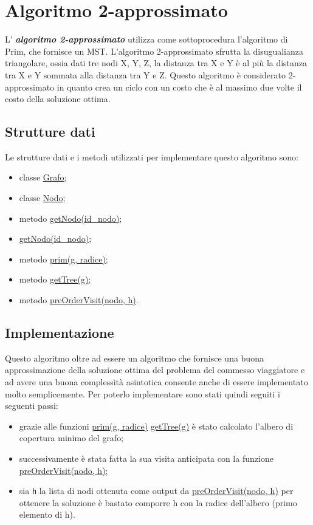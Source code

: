 \section{Algoritmo 2-approssimato}
\label{AlgoritmoApprossimato}

L' \textbf{\textit{algoritmo 2-approssimato}} utilizza come sottoprocedura l'algoritmo di Prim, che fornisce un MST.
L'algoritmo 2-approssimato sfrutta la disugualianza triangolare, ossia dati tre nodi X, Y, Z, la distanza tra X e Y è al più la distanza tra X e Y sommata alla distanza tra Y e Z.  
Questo algoritmo è considerato 2-approssimato in quanto crea un ciclo con un costo che è al massimo due volte il costo della soluzione ottima.

\subsection{Strutture dati}
\label{struttureDati3}

Le strutture dati e i metodi utilizzati per implementare questo algoritmo sono:

\begin{itemize}
    \item classe \hyperlink{subsection.2.1}{Grafo};
    \item classe \hyperlink{subsection.2.2}{Nodo};
    \item metodo \hyperlink{getNodo}{getNodo(id\_nodo)};
    \item \hyperlink{getNodo}{getNodo(id\_nodo)};
    \item metodo \hyperlink{prim}{prim(g, radice)};
    \item metodo \hyperlink{getTree}{getTree(g)};
    \item metodo \hyperlink{preOrderVisit}{preOrderVisit(nodo, h)}.
\end{itemize}


\subsection{Implementazione}
\label{implementazione3}

Questo algoritmo oltre ad essere un algoritmo che fornisce una buona approssimazione della soluzione ottima del problema del commesso viaggiatore e ad avere una buona complessità asintotica consente anche di essere implementato molto semplicemente.
Per poterlo implementare sono stati quindi seguiti i seguenti passi:

\begin{itemize}
    \item grazie alle funzioni \hyperlink{prim}{prim(g, radice)} \hyperlink{getTree}{getTree(g)} è stato calcolato l'albero di copertura minimo del grafo;
    \item successivamente è stata fatta la sua visita anticipata con la funzione \hyperlink{preOrderVisit}{preOrderVisit(nodo, h)};
    \item sia \texttt{h} la lista di nodi ottenuta come output da \hyperlink{preOrderVisit}{preOrderVisit(nodo, h)} per ottenere la soluzione è bastato comporre h con la radice dell'albero (primo elemento di h).
\end{itemize}
